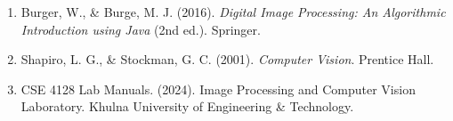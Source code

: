 \documentclass[12pt,a4paper]{article}
\begin{document}
\begin{enumerate}[leftmargin=*]
    \item Burger, W., \& Burge, M. J. (2016). \textit{Digital Image Processing: An Algorithmic Introduction using Java} (2nd ed.). Springer.

    \item Shapiro, L. G., \& Stockman, G. C. (2001). \textit{Computer Vision}. Prentice Hall.

    \item CSE 4128 Lab Manuals. (2024). Image Processing and Computer Vision Laboratory. Khulna University of Engineering \& Technology.
\end{enumerate}
\end{document}
